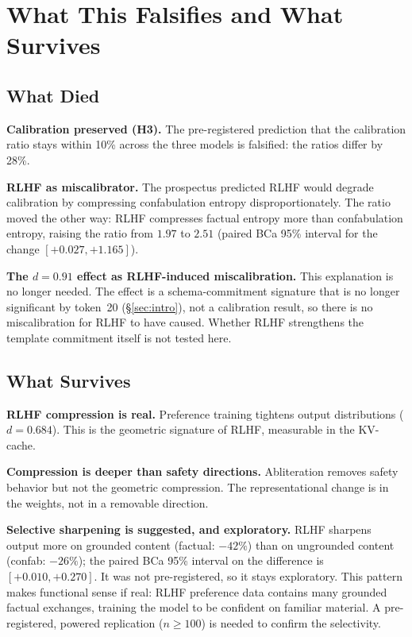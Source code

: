 \documentclass[11pt,a4paper]{article}
\begin{document}
\section{What This Falsifies and What Survives}
\label{sec:discussion}

\subsection{What Died}

\textbf{Calibration preserved (H3).} The pre-registered prediction
that the calibration ratio stays within 10\% across the three models
is falsified: the ratios differ by 28\%.

\textbf{RLHF as miscalibrator.} The prospectus predicted RLHF would
degrade calibration by compressing confabulation entropy
disproportionately. The ratio moved the other way: RLHF compresses
factual entropy more than confabulation entropy, raising the ratio from
$1.97$ to $2.51$ (paired BCa 95\% interval for the change
$[+0.027, +1.165]$).

\textbf{The $d{=}0.91$ effect as RLHF-induced miscalibration.} This
explanation is no longer needed. The effect is a schema-commitment
signature that is no longer significant by token~20
(\S\ref{sec:intro}), not a calibration result, so there is no
miscalibration for RLHF to have caused. Whether RLHF strengthens the
template commitment itself is not tested here.

\subsection{What Survives}

\textbf{RLHF compression is real.} Preference training tightens
output distributions ($d{=}0.684$). This is the geometric signature
of RLHF, measurable in the KV-cache.

\textbf{Compression is deeper than safety directions.} Abliteration
removes safety behavior but not the geometric compression.
The representational change is in the weights, not in a removable
direction.

\textbf{Selective sharpening is suggested, and exploratory.}
RLHF sharpens output more on grounded content (factual: $-42\%$)
than on ungrounded content (confab: $-26\%$); the paired BCa 95\%
interval on the difference is $[+0.010, +0.270]$. It was not
pre-registered, so it stays exploratory. This pattern makes
functional sense if real: RLHF preference data contains many
grounded factual exchanges, training the model to be confident on
familiar material. A pre-registered, powered replication
($n{\geq}100$) is needed to confirm the selectivity.
\end{document}
